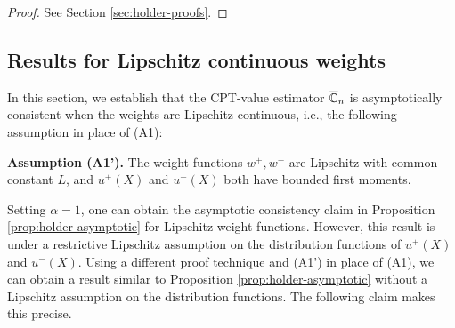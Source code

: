 \begin{proof}
%
%
See Section \ref{sec:holder-proofs}.
\end{proof}

\subsection{Results for Lipschitz continuous weights}
In this section, we establish that the CPT-value estimator $\overline {\mathbb{C}}_n$ is asymptotically consistent when the weights are Lipschitz continuous,  i.e., the following assumption in place of (A1):

\noindent\textbf{Assumption (A1').}  The weight functions $w^+, w^-$ are Lipschitz with common constant $L$, and 
$u^+(X)$ and $u^-(X)$ both have bounded first moments.

Setting $\alpha=1$, one can obtain the asymptotic consistency claim in Proposition \ref{prop:holder-asymptotic} for Lipschitz weight functions. However, this result is under  a restrictive Lipschitz assumption on the distribution functions of $u^+(X)$ and $u^-(X)$. Using a different proof technique and (A1') in place of (A1), we can obtain a result similar to Proposition \ref{prop:holder-asymptotic} without a Lipschitz assumption on the distribution functions. The following claim makes this precise.

